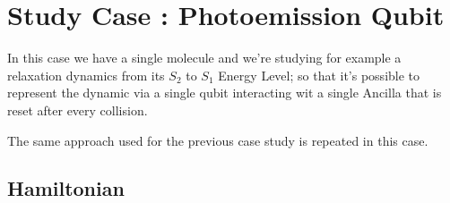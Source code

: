 \documentclass[a4paper,12pt]{article}
\begin{document}
\newpage

\section{Study Case : Photoemission Qubit}
\label{sec:Study_Case_Photoemission_Qubit}
In this case we have a single molecule and we're studying for example a relaxation dynamics from its $ S_2 $ to $ S_1 $ Energy Level; so that it's possible to represent the dynamic via a single qubit interacting wit a single Ancilla that is reset after every collision.

The same approach used for the previous case study is repeated in this case.

\subsection{Hamiltonian}
\label{sub:Hamiltonian_and_Evolution_Operator}
\end{document}
